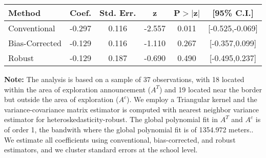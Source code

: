 \begin{table}[htbp]\centering
 \footnotesize 
\begin{tabular}{lccccc}
\hline\hline
Method & Coef. & Std. Err. & z & P$>|$z$|$ & [95\% C.I.] \\ 
\hline \hline  
Conventional & -0.297 & 0.116 & -2.557 & 0.011 & [-0.525,-0.069] \\ 
 Bias-Corrected & -0.129 & 0.116 & -1.110 & 0.267 & [-0.357,0.099] \\ 
Robust & -0.129 & 0.187 & -0.690 & 0.490 & [-0.495,0.237] \\ 
  \hline\hline
\end{tabular}
\label{table:rd}
\begin{tablenotes} 
  \justifying \tiny \textbf{Note: }    
   The analysis is based on a sample of 37 observations, with 18 located within the area of exploration announcement ($A^{T}$) and 19 located near the border but outside the area of exploration  ($A^{c}$). 
           We employ a Triangular kernel and the variance-covariance matrix estimator is computed with nearest neighbor variance estimator for heteroskedasticity-robust. The global polynomial fit in  $A^{T}$ and $A^{c}$ is of order 1, the bandwith where the global polynomial fit is of 1354.972 meters.. We estimate all coefficients using conventional, bias-corrected, and robust estimators, and we cluster standard errors at the school level. \end{tablenotes} 
 \end{table} 

